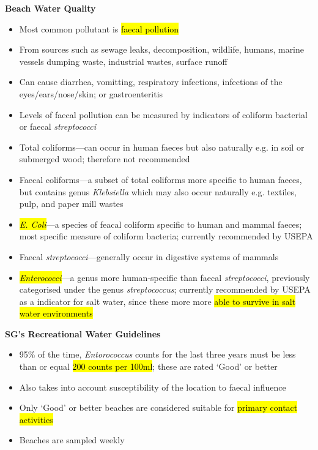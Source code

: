 \documentclass{article}
\newcommand{\headingsmall}[1]{{\small\textbf{#1}}}
\begin{document}
\begin{multicols*}{4}
\headingsmall{Beach Water Quality}
\begin{itemize} \itemsep -0.5em
    \item Most common pollutant is \hl{faecal pollution}
    \item From sources such as sewage leaks, decomposition, wildlife, humans, 
        marine vessels dumping waste, industrial wastes, surface runoff
    \item Can cause diarrhea, vomitting, respiratory infections, infections of
        the eyes/ears/nose/skin; or gastroenteritis
    \item Levels of faecal pollution can be measured by indicators of 
        coliform bacterial or faecal \textit{streptococci}
    \item Total coliforms---can occur in human faeces but also naturally e.g. 
        in soil or submerged wood; therefore not recommended
    \item Faecal coliforms---a subset of total coliforms more specific to
        human faeces, but contains genus \textit{Klebsiella} which may also
        occur naturally e.g. textiles, pulp, and paper mill wastes
    \item \hl{\textit{E. Coli}}---a species of feacal coliform specific to human
        and mammal faeces; most specific measure of coliform bacteria; currently
        recommended by USEPA
    \item Faecal \textit{streptococci}---generally occur in digestive systems
        of mammals
    \item \hl{\textit{Enterococci}}---a genus more human-specific than faecal
        \textit{streptococci}, previously categorised under the 
        genus \textit{streptococcus}; currently recommended by USEPA as a
        indicator for salt water, since these more more \hl{able to survive in
        salt water environments}
\end{itemize}

\headingsmall{SG's Recreational Water Guidelines}
\begin{itemize} \itemsep -0.5em
    \item 95\% of the time, \textit{Entorococcus} counts for the last three years
        must be less than or equal \hl{200 counts per 100ml}; these are rated 
        `Good' or better
    \item Also takes into account susceptibility of the location to faecal influence
    \item Only `Good' or better beaches are considered suitable for \hl{primary 
        contact activities}
    \item Beaches are sampled weekly
\end{itemize}


\end{multicols*}
\end{document}
